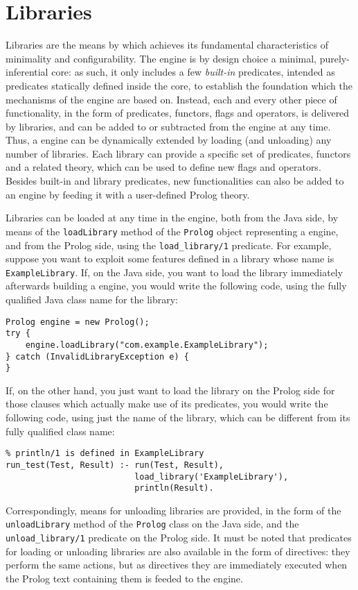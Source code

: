 \chapter{\tuprolog{} Libraries}
\label{ch:standard-libraries}

Libraries are the means by which \tuprolog{} achieves its
fundamental characteristics of minimality and configurability.
%
The engine is by design choice a minimal, purely-inferential core: as
such, it only includes a few \emph{built-in} predicates, intended as
predicates statically defined inside the core, to establish the
foundation which the mechanisms of the engine are based on.
%
Instead, each and every other piece of functionality, in the form of
predicates, functors, flags and operators, is delivered by libraries,
and can be added to or subtracted from the engine at any time.
%
Thus, a \tuprolog{} engine can be dynamically extended by loading
(and unloading) any number of libraries. Each library can provide a
specific set of predicates, functors and a related theory, which can
be used to define new flags and operators.
%
Besides built-in and library predicates, new functionalities can also
be added to an engine by feeding it with a user-defined Prolog theory.

Libraries can be loaded at any time in the \tuprolog{} engine, both
from the Java side, by means of the \texttt{loadLibrary} method of
the \texttt{Prolog} object representing a \tuprolog{} engine, and
from the Prolog side, using the \texttt{load\_library/1} predicate.
%
For example, suppose you want to exploit some features defined in a
library whose name is \texttt{ExampleLibrary}. If, on the Java side,
you want to load the library immediately afterwards building a
\tuprolog{} engine, you would write the following code, using the
fully qualified Java class name for the library:
%
\begin{verbatim}
Prolog engine = new Prolog();
try {
    engine.loadLibrary("com.example.ExampleLibrary");
} catch (InvalidLibraryException e) {
}
\end{verbatim}
%
If, on the other hand, you just want to load the library on the Prolog
side for those clauses which actually make use of its predicates, you
would write the following code, using just the name of the library,
which can be different from its fully qualified class name:
%
\begin{verbatim}
% println/1 is defined in ExampleLibrary
run_test(Test, Result) :- run(Test, Result),
                          load_library('ExampleLibrary'),
                          println(Result).
\end{verbatim}
%
Correspondingly, means for unloading libraries are provided, in the
form of the \texttt{unloadLibrary} method of the \texttt{Prolog}
class on the Java side, and the \texttt{unload\_library/1} predicate
on the Prolog side.
%
It must be noted that predicates for loading or unloading libraries
are also available in the form of directives: they perform the same
actions, but as directives they are immediately executed when the
Prolog text containing them is feeded to the engine.

